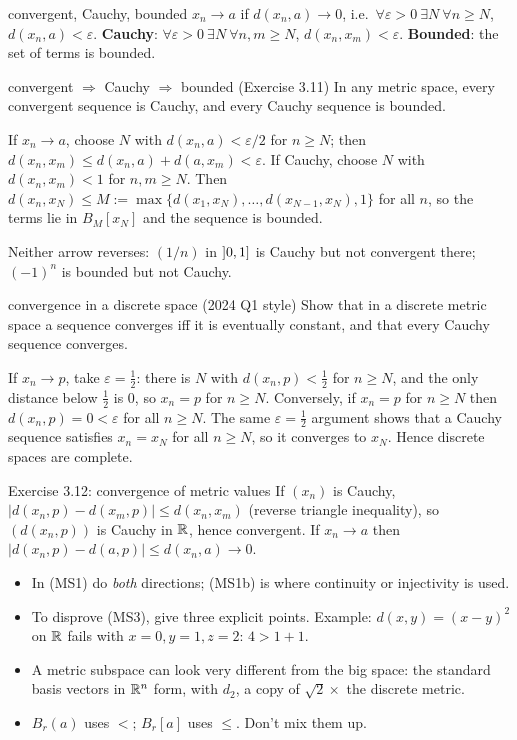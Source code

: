 \begin{defn}{convergent, Cauchy, bounded}
$x_n\to a$ if $d(x_n,a)\to0$, i.e.\ $\forall\varepsilon>0\ \exists N\ \forall n\ge N$,
$d(x_n,a)<\varepsilon$. \textbf{Cauchy}: $\forall\varepsilon>0\ \exists N\ \forall n,m\ge N$,
$d(x_n,x_m)<\varepsilon$. \textbf{Bounded}: the set of terms is bounded.
\end{defn}
\begin{thm}{convergent $\Rightarrow$ Cauchy $\Rightarrow$ bounded (Exercise 3.11)}
In any metric space, every convergent sequence is Cauchy, and every Cauchy sequence is bounded.
\end{thm}
\begin{answer}
If $x_n\to a$, choose $N$ with $d(x_n,a)<\varepsilon/2$ for $n\ge N$; then
$d(x_n,x_m)\le d(x_n,a)+d(a,x_m)<\varepsilon$. If Cauchy, choose $N$ with $d(x_n,x_m)<1$ for
$n,m\ge N$. Then $d(x_n,x_N)\le M:=\max\{d(x_1,x_N),\dots,d(x_{N-1},x_N),1\}$ for all $n$, so
the terms lie in $B_{M}[x_N]$ and the sequence is bounded.
\end{answer}
Neither arrow reverses: $(1/n)$ in $\mathopen{]}0,1\mathclose{]}$ is Cauchy but not convergent there; $(-1)^n$ is
bounded but not Cauchy.

\begin{exam}{convergence in a discrete space (2024 Q1 style)}
Show that in a discrete metric space a sequence converges iff it is eventually constant, and
that every Cauchy sequence converges.
\end{exam}
\begin{answer}
If $x_n\to p$, take $\varepsilon=\frac12$: there is $N$ with $d(x_n,p)<\frac12$ for $n\ge N$, and
the only distance below $\frac12$ is $0$, so $x_n=p$ for $n\ge N$. Conversely, if $x_n=p$ for
$n\ge N$ then $d(x_n,p)=0<\varepsilon$ for all $n\ge N$. The same $\varepsilon=\frac12$ argument
shows that a Cauchy sequence satisfies $x_n=x_N$ for all $n\ge N$, so it converges to $x_N$.
Hence discrete spaces are complete.
\end{answer}

\begin{example}{Exercise 3.12: convergence of metric values}
If $(x_n)$ is Cauchy, $|d(x_n,p)-d(x_m,p)|\le d(x_n,x_m)$ (reverse triangle inequality), so
$(d(x_n,p))$ is Cauchy in $\mathbb R$, hence convergent. If $x_n\to a$ then
$|d(x_n,p)-d(a,p)|\le d(x_n,a)\to0$.
\end{example}

\begin{tip}
\begin{itemize}
\item In (MS1) do \emph{both} directions; (MS1b) is where continuity or injectivity is used.
\item To disprove (MS3), give three explicit points. Example: $d(x,y)=(x-y)^2$ on $\mathbb R$ fails
  with $x=0,y=1,z=2$: $4>1+1$.
\item A metric subspace can look very different from the big space: the standard basis
  vectors in $\mathbb R^n$ form, with $d_2$, a copy of $\sqrt2\times$ the discrete metric.
\item $B_r(a)$ uses $<$; $B_r[a]$ uses $\le$. Don't mix them up.
\end{itemize}
\end{tip}
